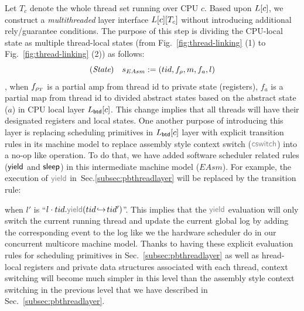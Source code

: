 Let $T_c$ denote the whole thread set running over CPU $c$.
Based upon  $L[c]$,  we construct a 
\emph{multithreaded} layer interface $L[c][T_c]$ without introducing 
additional rely/guarantee conditions.
The purpose of this step is dividing the  CPU-local state as multiple thread-local states
(from Fig.~\ref{fig:thread-linking} (1) to  Fig.~\ref{fig:thread-linking} (2)) as follows:
\[(\textit{State})\ \ \ s_{EAsm}  :=  (tid, f_{\regs}, m, f_{a},l)\]
, when $f_{\rho_{T}}$ is a partial amp from thread id to private state (registers), $f_{a}$ is a partial
map from thread id to divided abstract states based on the abstract state ($a$) in CPU local layer $L_{\mathsf{\textcolor{black}{btd}}}[c]$.
This change implies that all threads will have their designated registers and local states.
One another purpose of introducing this layer is replacing scheduling primitives in $L_{\mathsf{\textcolor{black}{btd}}}[c]$ layer 
with explicit transition rules in its machine model to
replace assembly style context switch ($\commc{cswitch}$) into a no-op 
like operation. 
To do that, we have added software scheduler related rules ($\mathsf{\textcolor{black}{yield}}$ and $\mathsf{\textcolor{black}{sleep}}$) 
in this intermediate machine model ($EAsm$). 
For example, the execution of $\commc{yield}$ in~Sec.\ref{subsec:pbthreadlayer} will be replaced by
the transition rule:
\begin{center}
\end{center} 
when $l'$ is ``$l \cdot tid.\commc{yield} (tid \switch tid')$''.
This implies that the $\commc{yield}$ evaluation will only switch the current running thread and update the current global log 
by adding the corresponding event to the log like we the hardware scheduler do in our concurrent multicore machine model.
Thanks to having these explicit evaluation rules for scheduling primitives in Sec.~\ref{subsec:pbthreadlayer} as well as
hread-local registers and private data structures associated with each thread, 
context switching will become much simpler in this level than the assembly style context switching 
in the previous level that we have described in Sec.~\ref{subsec:pbthreadlayer}.


